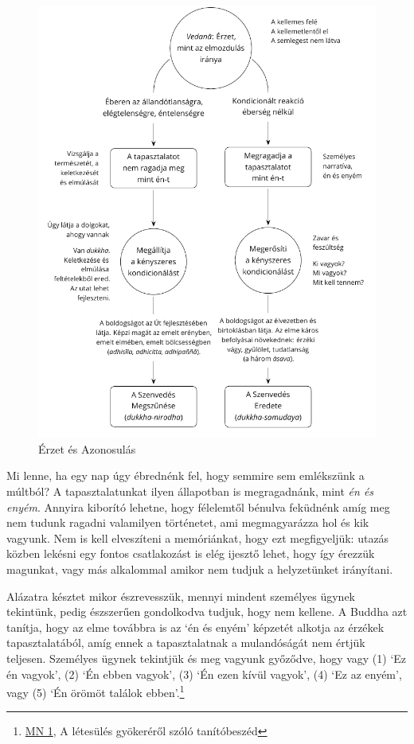 \begin{figure}[h]
\vspace*{-5mm}
\caption{Érzet és Azonosulás}\label{fig-feeling-identification}
\bigskip
\includegraphics[width=\linewidth]{./manuscript/tex/diagrams/feeling-identification-hu.pdf}
\end{figure}

\clearpage
\normalpagelayout

Mi lenne, ha egy nap úgy ébrednénk fel, hogy semmire sem emlékszünk a
múltból? A tapasztalatunkat ilyen állapotban is megragadnánk, mint
\emph{én és enyém}. Annyira kiborító lehetne, hogy félelemtől bénulva
feküdnénk amíg meg nem tudunk ragadni valamilyen történetet, ami
megmagyarázza hol és kik vagyunk. Nem is kell elveszíteni a memóriánkat,
hogy ezt megfigyeljük: utazás közben lekésni egy fontos csatlakozást is
elég ijesztő lehet, hogy így érezzük magunkat, vagy más alkalommal
amikor nem tudjuk a helyzetünket irányítani.

Alázatra késztet mikor észrevesszük, mennyi mindent személyes ügynek
tekintünk, pedig észszerűen gondolkodva tudjuk, hogy nem kellene. A
Buddha azt tanítja, hogy az elme továbbra is az `én és enyém' képzetét
alkotja az érzékek tapasztalatából, amíg ennek a tapasztalatnak a
mulandóságát nem értjük teljesen. Személyes ügynek tekintjük és meg
vagyunk győződve, hogy vagy (1) `Ez én vagyok', (2) `Én ebben vagyok',
(3) `Én ezen kívül vagyok', (4) `Ez az enyém', vagy (5) `Én örömöt
találok ebben'.\footnote{\href{https://a-buddha-ujja.hu/mn-1/hu/pressing-lajos}{MN
  1}, A létesülés gyökeréről szóló tanítóbeszéd}

